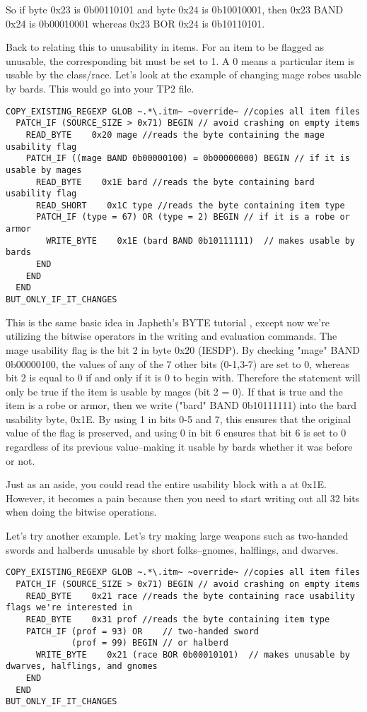 \documentclass{article}
\def\ttref#1{\ahrefloc{#1}{\tt #1}}
\begin{document}
So if byte 0x23 is 0b00110101 and byte 0x24 is 0b10010001, then 0x23 BAND
0x24 is 0b00010001 whereas 0x23 BOR 0x24 is 0b10110101.

Back to relating this to unusability in items. For an item to be flagged as
unusable, the corresponding bit must be set to 1. A 0 means a particular
item is usable by the class/race. Let's look at the example of changing
mage robes usable by bards. This would go into your TP2 file.

\begin{verbatim}
COPY_EXISTING_REGEXP GLOB ~.*\.itm~ ~override~ //copies all item files
  PATCH_IF (SOURCE_SIZE > 0x71) BEGIN // avoid crashing on empty items
    READ_BYTE    0x20 mage //reads the byte containing the mage usability flag
    PATCH_IF ((mage BAND 0b00000100) = 0b00000000) BEGIN // if it is usable by mages
      READ_BYTE    0x1E bard //reads the byte containing bard usability flag
      READ_SHORT    0x1C type //reads the byte containing item type
      PATCH_IF (type = 67) OR (type = 2) BEGIN // if it is a robe or armor
        WRITE_BYTE    0x1E (bard BAND 0b10111111)  // makes usable by bards
      END
    END
  END
BUT_ONLY_IF_IT_CHANGES
\end{verbatim}

This is the same basic idea in Japheth's BYTE tutorial , except now we're
utilizing the bitwise operators in the writing and evaluation commands. The
mage usability flag is the bit 2 in byte 0x20 (IESDP). By checking "mage"
BAND 0b00000100, the values of any of the 7 other bits (0-1,3-7) are set to
0, whereas bit 2 is equal to 0 if and only if it is 0 to begin with.
Therefore the statement will only be true if the item is usable by mages
(bit 2 = 0). If that is true and the item is a robe or armor, then we write
("bard" BAND 0b10111111) into the bard usability byte, 0x1E. By using 1
in bits 0-5 and 7, this ensures that the original value of the flag is
preserved, and using 0 in bit 6 ensures that bit 6 is set to 0 regardless
of its previous value--making it usable by bards whether it was before or
not.

Just as an aside, you could read the entire usability block with a
\ttref{READ!LONG} at 0x1E. However, it becomes a pain because then you need
to start writing out all 32 bits when doing the bitwise operations.

Let's try another example. Let's try making large weapons such as
two-handed swords and halberds unusable by short folks--gnomes, halflings,
and dwarves.

\begin{verbatim}
COPY_EXISTING_REGEXP GLOB ~.*\.itm~ ~override~ //copies all item files
  PATCH_IF (SOURCE_SIZE > 0x71) BEGIN // avoid crashing on empty items
    READ_BYTE    0x21 race //reads the byte containing race usability flags we're interested in
    READ_BYTE    0x31 prof //reads the byte containing item type
    PATCH_IF (prof = 93) OR    // two-handed sword
             (prof = 99) BEGIN // or halberd
      WRITE_BYTE    0x21 (race BOR 0b00010101)  // makes unusable by dwarves, halflings, and gnomes
    END
  END
BUT_ONLY_IF_IT_CHANGES

\end{verbatim}
\end{document}
